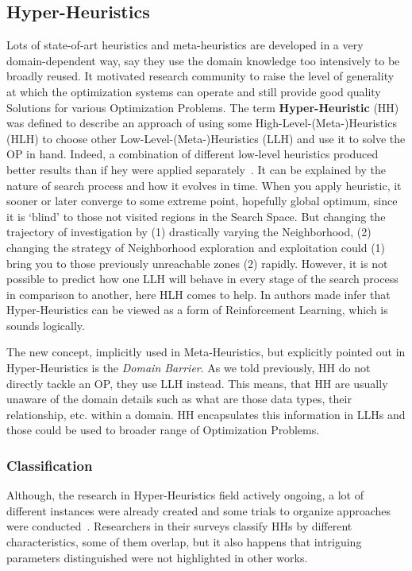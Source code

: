 \subsection{Hyper-Heuristics}
Lots of state-of-art heuristics and meta-heuristics are developed in a very domain-dependent way, say they use the domain knowledge too intensively to be broadly reused. It motivated research community to raise the level of generality at which the optimization systems can operate and still provide good quality Solutions for various Optimization Problems. The term \textbf{Hyper-Heuristic} (HH) was defined to describe an approach of using some High-Level-(Meta-)Heuristics (HLH) to choose other Low-Level-(Meta-)Heuristics (LLH) and use it to solve the OP in hand. Indeed, a combination of different low-level heuristics produced better results than if hey were applied separately~\cite{drake2019recent}.
It can be explained by the nature of search process and how it evolves in time. When you apply heuristic, it sooner or later converge to some extreme point, hopefully global optimum, since it is `blind' to those not visited regions in the Search Space. But changing the trajectory of investigation by (1) drastically varying the Neighborhood, (2) changing the strategy of Neighborhood exploration and exploitation could (1) bring you to those previously unreachable zones (2) rapidly. However, it is not possible to predict how one LLH will behave in every stage of the search process in comparison to another, here HLH comes to help. In \cite{moriarty1999evolutionary} authors made infer that Hyper-Heuristics can be viewed as a form of Reinforcement Learning, which is sounds logically.


The new concept, implicitly used in Meta-Heuristics, but explicitly pointed out in Hyper-Heuristics is the \textit{Domain Barrier}.
As we told previously, HH do not directly tackle an OP, they use LLH instead. This means, that HH are usually unaware of the domain details such as what are those data types, their relationship, etc. within a domain. HH encapsulates this information in LLHs and those could be used to broader range of Optimization Problems.




\subsubsection{Classification}
Although, the research in Hyper-Heuristics field actively ongoing, a lot of different instances were already created and some trials to organize approaches were conducted~\cite{ryser2014review,drake2019recent,burke2019classification,kerschke2019automated}.
Researchers in their surveys classify HHs by different characteristics, some of them overlap, but it also happens that intriguing parameters distinguished were not highlighted in other works. 

